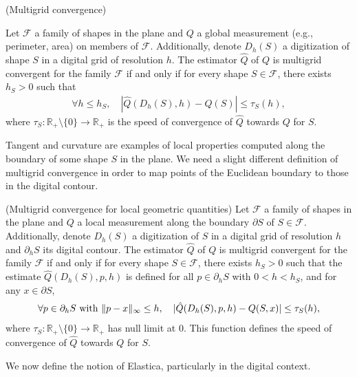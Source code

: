 \documentclass[runningheads]{llncs}
\DeclarePairedDelimiter\norm{\lVert}{\rVert}%
\begin{document}
\begin{definition}{(Multigrid convergence)}

  Let $\mathcal{F}$ a family of shapes in the plane and $Q$ a global measurement (e.g., perimeter, area) on members of
  $\mathcal{F}$. Additionally, denote $D_h(S)$ a digitization of shape $S$ in a digital grid of resolution $h$. The
  estimator $\hat{Q}$ of $Q$ is multigrid convergent for the family $\mathcal{F}$ if and only if for every shape
  $S \in \mathcal{F}$, there exists $h_S > 0$ such that
\begin{align*}
\forall h \leq h_S, \quad |\hat{Q}(D_h(S),h) - Q(S)| \leq \tau_S(h),
\end{align*}
%
where $\tau_S:\mathbb{R}_+\setminus \{0\} \rightarrow \mathbb{R}_+$ is the speed of convergence of $\hat{Q}$ towards $Q$
for $S$.
\end{definition}

Tangent and curvature are examples of local properties computed along the boundary of some shape $S$ in the plane. We
need a slight different definition of multigrid convergence in order to map points of the Euclidean boundary to those in
the digital contour.

\begin{definition}{(Multigrid convergence for local geometric quantities)}
  Let $\mathcal{F}$ a family of shapes in the plane and $Q$ a local measurement along the boundary $\partial S$ of
  $S \in \mathcal{F}$. Additionally, denote $D_h(S)$ a digitization of $S$ in a digital grid of resolution $h$ and
  $\partial_h S$ its digital contour. The estimator $\hat{Q}$ of $Q$ is multigrid convergent for the family
  $\mathcal{F}$ if and only if for every shape $S \in \mathcal{F}$, there exists $h_S > 0$ such that the estimate
  $\hat{Q}(D_h(S),p,h)$ is defined for all $p \in \partial_h S$ with $0 < h < h_S$, and for any $x \in \partial S$,
\begin{align*}
	\forall p \in \partial_h S \text{ with } \norm{p-x}_{\infty} \leq h,\quad | \hat{Q}(D_h(S),p,h) - Q(S,x) | \leq \tau_S(h),	
\end{align*}
where $\tau_S:\mathbb{R}_+\setminus \{0\} \rightarrow \mathbb{R}_+$ has null limit at $0$. This function defines the
speed of convergence of $\hat{Q}$ towards $Q$ for $S$.
\end{definition}

We now define the notion of Elastica, particularly in the digital context.
\end{document}
